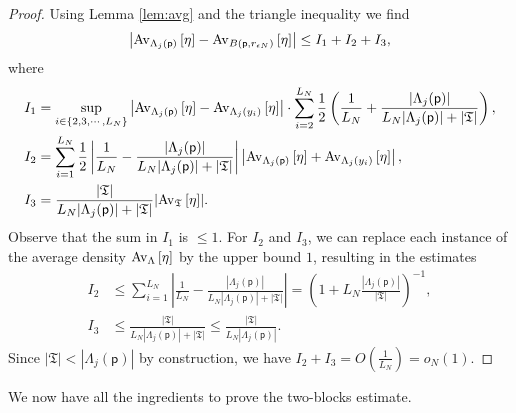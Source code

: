 \documentclass[11pt]{amsart}
\theoremstyle{plain}
\theoremstyle{definition}
\theoremstyle{remark}
\begin{document}
\begin{proof}
Using Lemma \ref{lem:avg} and the triangle inequality we find
\begin{align*}
\left|{{\rm Av}_{{\Lambda_j({\mathsf{p}})}}\left[{{\eta}}\right]} - {{\rm Av}_{{B({\mathsf{p}}, r_{\epsilon N})}}\left[{{\eta}}\right]}\right| \leq I_1 + I_2 + I_3,
\end{align*}
where
\begin{align*}
I_1 &= \sup_{i\in \{2,3,\cdots, L_N\}} \left| {{\rm Av}_{{\Lambda_j({\mathsf{p}})}}\left[{{\eta}}\right]} - {{\rm Av}_{{\Lambda_j(y_i)}}\left[{{\eta}}\right]}\right| \cdot \sum_{i=2}^{L_N} \frac{1}{2} \left(\frac{1}{L_N} + \frac{|\Lambda_j({\mathsf{p}})|}{L_N |\Lambda_j({\mathsf{p}})| + |\mathfrak{T}|} \right),\\
I_2 &= \sum_{i=1}^{L_N} \frac{1}{2} \left|\frac{1}{L_N} - \frac{|\Lambda_j({\mathsf{p}})|}{L_N|\Lambda_j({\mathsf{p}})| + |\mathfrak{T}|} \right| \left|{{\rm Av}_{{\Lambda_j({\mathsf{p}})}}\left[{{\eta}}\right]} + {{\rm Av}_{{\Lambda_j(y_i)}}\left[{{\eta}}\right]}\right|,\\
I_3 &= \frac{|\mathfrak{T}|}{L_N |\Lambda_j({\mathsf{p}})| + |\mathfrak{T}|} |{{\rm Av}_{{\mathfrak{T}}}\left[{{\eta}}\right]}|.
\end{align*}
Observe that the sum in $I_1$ is $\leq 1$. For $I_2$ and $I_3$, we can replace each instance of the average density ${{\rm Av}_{{\Lambda}}\left[{{\eta}}\right]}$ by the upper bound $1$, resulting in the estimates
\begin{align*}
I_2 &\leq \sum_{i=1}^{L_N} \left|\frac{1}{L_N} - \frac{|\Lambda_j({\mathsf{p}})|}{L_N|\Lambda_j({\mathsf{p}})|+|\mathfrak{T}|}\right| = \left( 1+ L_N\frac{|\Lambda_j({\mathsf{p}})|}{|\mathfrak{T}|}\right)^{-1}, \\
I_3 &\leq \frac{|\mathfrak{T}|}{L_N |\Lambda_j({\mathsf{p}})|+ |\mathfrak{T}|} \leq \frac{|\mathfrak{T}|}{L_N |\Lambda_j({\mathsf{p}})|}. 
\end{align*}
Since $|\mathfrak{T}| < |\Lambda_j({\mathsf{p}})|$ by construction, we have $I_2 + I_3 = O\left(\frac{1}{L_N}\right)= o_N(1)$.
\end{proof}

We now have all the ingredients to prove the two-blocks estimate.
\end{document}
